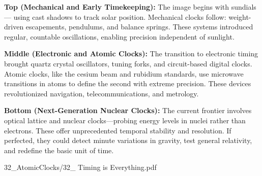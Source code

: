 \begin{SideNotePage}{
  \textbf{Top (Mechanical and Early Timekeeping):}  
  The image begins with sundials — using cast shadows to track solar position. Mechanical clocks follow: weight-driven escapements, pendulums, and balance springs. These systems introduced regular, countable oscillations, enabling precision independent of sunlight. \par

  \textbf{Middle (Electronic and Atomic Clocks):}  
  The transition to electronic timing brought quartz crystal oscillators, tuning forks, and circuit-based digital clocks. Atomic clocks, like the cesium beam and rubidium standards, use microwave transitions in atoms to define the second with extreme precision. These devices revolutionized navigation, telecommunications, and metrology. \par

  \textbf{Bottom (Next-Generation Nuclear Clocks):}  
  The current frontier involves optical lattice and nuclear clocks—probing energy levels in nuclei rather than electrons. These offer unprecedented temporal stability and resolution. If perfected, they could detect minute variations in gravity, test general relativity, and redefine the basic unit of time. \par
}{32_AtomicClocks/32_ Timing is Everything.pdf}
\end{SideNotePage}
